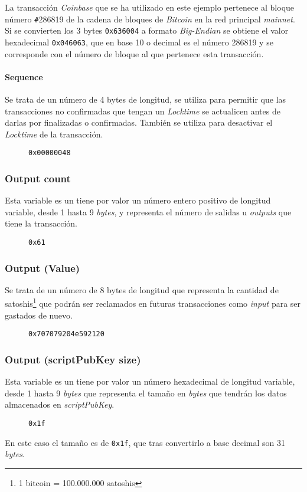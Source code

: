 \documentclass{article}
\begin{document}
    La transacción \textit{Coinbase} que se ha utilizado en este ejemplo pertenece al bloque número \texttt{\#}286819 de la cadena de bloques de \textit{Bitcoin} en la red principal \textit{mainnet}. Si se convierten los 3 bytes \texttt{0x636004} a formato \textit{Big-Endian} se obtiene el valor hexadecimal \texttt{0x046063}, que en base 10 o decimal es el número 286819 y se corresponde con el número de bloque al que pertenece esta transacción.
    
    \paragraph{Sequence}
    Se trata de un número de 4 bytes de longitud, se utiliza para permitir que las transacciones no confirmadas que tengan un \textit{Locktime} se actualicen antes de darlas por finalizadas o confirmadas. También se utiliza para desactivar el \textit{Locktime} de la transacción.
    \begin{figure}[H]
        \texttt{0x00000048}
    \end{figure}
    
    \subsubsection{Output count}
    Esta variable es un tiene por valor un número entero positivo de longitud variable, desde 1 hasta 9 \textit{bytes}, y representa el número de salidas u \textit{outputs} que tiene la transacción.
    \begin{figure}[H]
        \texttt{0x61}
    \end{figure}
    
    \subsubsection{Output (Value)}
    Se trata de un número de 8 bytes de longitud que representa la cantidad de satoshis\footnote{1 bitcoin = 100.000.000 satoshis} que podrán ser reclamados en futuras transacciones como \textit{input} para ser gastados de nuevo.
    \begin{figure}[H]
        \texttt{0x707079204e592120}
    \end{figure}
    
    \subsubsection{Output (scriptPubKey size)}
    Esta variable es un tiene por valor un número hexadecimal de longitud variable, desde 1 hasta 9 \textit{bytes} que representa el tamaño en \textit{bytes} que tendrán los datos almacenados en \textit{scriptPubKey}.
    \begin{figure}[H]
        \texttt{0x1f}
    \end{figure}
    En este caso el tamaño es de \texttt{0x1f}, que tras convertirlo a base decimal son 31 \textit{bytes}.
    
\end{document}
